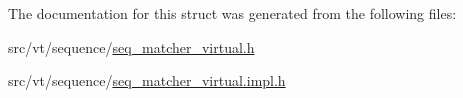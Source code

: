 The documentation for this struct was generated from the following files\+:\begin{DoxyCompactItemize}
\item 
src/vt/sequence/\hyperlink{seq__matcher__virtual_8h}{seq\+\_\+matcher\+\_\+virtual.\+h}\item 
src/vt/sequence/\hyperlink{seq__matcher__virtual_8impl_8h}{seq\+\_\+matcher\+\_\+virtual.\+impl.\+h}\end{DoxyCompactItemize}
